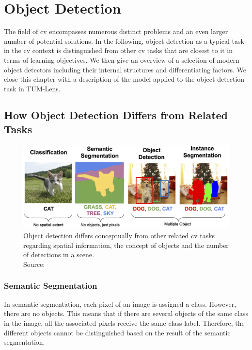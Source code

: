 \documentclass[
			   fontsize=11pt,
               paper=a4,
               bibliography=totoc,
               idxtotoc,
               headsepline,
               footsepline,
               footinclude=false,
               BCOR=12mm,
               DIV=13,
               openany,   %
               ]
               {scrbook}
\begin{document}
\chapter{Object Detection}

The field of \gls{cv} encompasses numerous distinct problems and an even larger number of potential solutions. In the following, object detection as a typical task in the \gls{cv} context is distinguished from other \gls{cv} tasks that are closest to it in terms of learning objectives. We then give an overview of a selection of modern object detectors including their internal structures and differentiating factors. We close this chapter with a description of the model applied to the object detection task in TUM-Lens.

\section{How Object Detection Differs from Related Tasks} \label{sec:cvtasks}

\begin{figure}[H] %
	\centering
	\includegraphics[width=\textwidth]{figures/detection_related_tasks.png}
	\caption[Typical Computer Vision Tasks]{Object detection differs conceptually from other related \gls{cv} tasks regarding spatial information, the concept of objects and the number of detections in a scene.\\
		\tiny{Source:~\cite{cvTasks}}}
	\label{fig:cvTasks} %
\end{figure}

\subsection{Semantic Segmentation}
In semantic segmentation, each pixel of an image is assigned a class. However, there are no objects. This means that if there are several objects of the same class in the image, all the associated pixels receive the same class label. Therefore, the different objects cannot be distinguished based on the result of the semantic segmentation.
\end{document}
